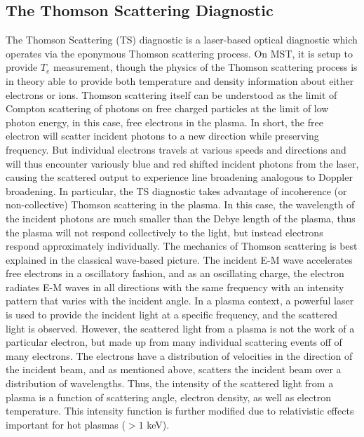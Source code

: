 \subsection{The Thomson Scattering Diagnostic}

The Thomson Scattering (TS) diagnostic is a laser-based optical diagnostic which operates via the eponymous Thomson scattering process. On MST, it is setup to provide $T_e$ measurement, though the physics of the Thomson scattering process is in theory able to provide both temperature and density information about either electrons or ions. Thomson scattering itself can be understood as the limit of Compton scattering of photons on free charged particles at the limit of low photon energy, in this case, free electrons in the plasma. In short, the free electron will scatter incident photons to a new direction while preserving frequency. But individual electrons travels at various speeds and directions and will thus encounter variously blue and red shifted incident photons from the laser, causing the scattered output to experience line broadening analogous to Doppler broadening. In particular, the TS diagnostic takes advantage of incoherence (or non-collective) Thomson scattering in the plasma.  In this case, the wavelength of the incident photons are much smaller than the Debye length of the plasma, thus the plasma will not respond collectively to the light, but instead electrons respond approximately individually. The mechanics of Thomson scattering is best explained in the classical wave-based picture. The incident E-M wave accelerates free electrons in a oscillatory fashion, and as an oscillating charge, the electron radiates E-M waves in all directions with the same frequency with an intensity pattern that varies with the incident angle. In a plasma context, a powerful laser is used to provide the incident light at a specific frequency, and the scattered light is observed. However, the scattered light from a plasma is not the work of a particular electron, but made up from many individual scattering events off of many electrons. The electrons have a distribution of velocities in the direction of the incident beam, and as mentioned above, scatters the incident beam over a distribution of wavelengths. Thus, the intensity of the scattered light from a plasma is a function of scattering angle, electron density, as well as electron temperature. This intensity function is further modified due to relativistic effects important for hot plasmas ($>1$ keV). 
 
